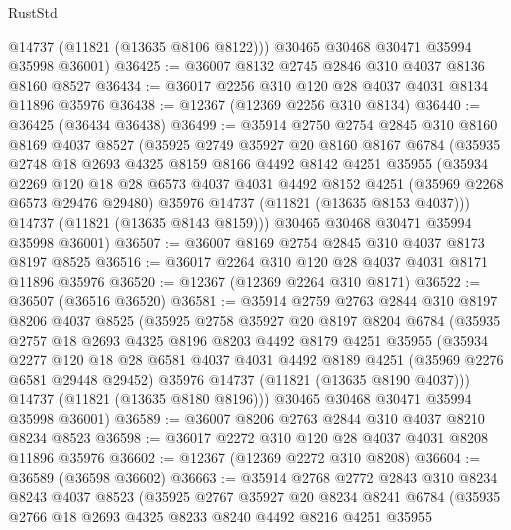 \begin{lexlean}{RustStd}
\begin{coremodule}
        @14737
        (@11821 (@13635 @8106 @8122)))
      @30465
      @30468
      @30471
      @35994
      @35998
      @36001)
@36425 := @36007 @8132 @2745 @2846 @310 @4037 @8136 @8160 @8527
@36434 := @36017 @2256 @310 @120 @28 @4037 @4031 @8134 @11896 @35976
@36438 := @12367 (@12369 @2256 @310 @8134)
@36440 := @36425 (@36434 @36438)
@36499 := @35914
    @2750
    @2754
    @2845
    @310
    @8160
    @8169
    @4037
    @8527
    (@35925
      @2749
      @35927
      @20
      @8160
      @8167
      @6784
      (@35935
        @2748
        @18
        @2693
        @4325
        @8159
        @8166
        @4492
        @8142
        @4251
        @35955
        (@35934
          @2269
          @120
          @18
          @28
          @6573
          @4037
          @4031
          @4492
          @8152
          @4251
          (@35969 @2268 @6573 @29476 @29480)
          @35976
          @14737
          (@11821 (@13635 @8153 @4037)))
        @14737
        (@11821 (@13635 @8143 @8159)))
      @30465
      @30468
      @30471
      @35994
      @35998
      @36001)
@36507 := @36007 @8169 @2754 @2845 @310 @4037 @8173 @8197 @8525
@36516 := @36017 @2264 @310 @120 @28 @4037 @4031 @8171 @11896 @35976
@36520 := @12367 (@12369 @2264 @310 @8171)
@36522 := @36507 (@36516 @36520)
@36581 := @35914
    @2759
    @2763
    @2844
    @310
    @8197
    @8206
    @4037
    @8525
    (@35925
      @2758
      @35927
      @20
      @8197
      @8204
      @6784
      (@35935
        @2757
        @18
        @2693
        @4325
        @8196
        @8203
        @4492
        @8179
        @4251
        @35955
        (@35934
          @2277
          @120
          @18
          @28
          @6581
          @4037
          @4031
          @4492
          @8189
          @4251
          (@35969 @2276 @6581 @29448 @29452)
          @35976
          @14737
          (@11821 (@13635 @8190 @4037)))
        @14737
        (@11821 (@13635 @8180 @8196)))
      @30465
      @30468
      @30471
      @35994
      @35998
      @36001)
@36589 := @36007 @8206 @2763 @2844 @310 @4037 @8210 @8234 @8523
@36598 := @36017 @2272 @310 @120 @28 @4037 @4031 @8208 @11896 @35976
@36602 := @12367 (@12369 @2272 @310 @8208)
@36604 := @36589 (@36598 @36602)
@36663 := @35914
    @2768
    @2772
    @2843
    @310
    @8234
    @8243
    @4037
    @8523
    (@35925
      @2767
      @35927
      @20
      @8234
      @8241
      @6784
      (@35935
        @2766
        @18
        @2693
        @4325
        @8233
        @8240
        @4492
        @8216
        @4251
        @35955

\end{coremodule}
\end{lexlean}
